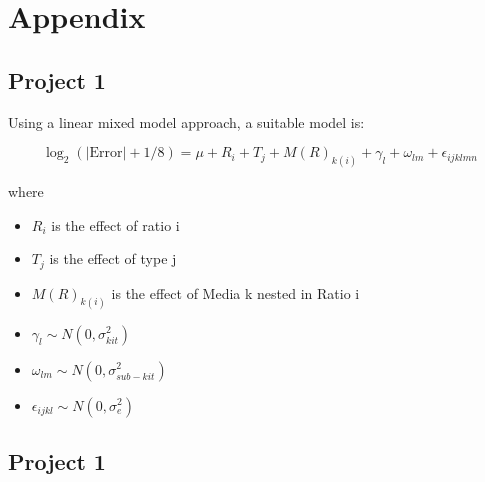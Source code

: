 \documentclass[phd]{nuthesis}
\begin{document}
\section{Appendix}\label{appendix}

\subsection{Project 1}\label{project-1-1}

Using a linear mixed model approach, a suitable model is:

\[
\log_2(|\text{Error}|+ 1/8)=\mu+R_i+T_j+M(R)_{k(i)} + \gamma_l + \omega_{lm} +  \epsilon_{ijklmn}
\]

where

\begin{itemize}
\tightlist
\item
  \(R_i\) is the effect of ratio i
\item
  \(T_j\) is the effect of type j
\item
  \(M(R)_{k(i)}\) is the effect of Media k nested in Ratio i
\item
  \(\gamma_l\sim N(0,\sigma^2_{kit})\)
\item
  \(\omega_{lm}\sim N(0,\sigma^2_{sub-kit})\)
\item
  \(\epsilon_{ijkl}\sim N(0,\sigma^2_{e})\)
\end{itemize}

\subsection{Project 1}\label{project-1-2}

\begin{Shaded}
\begin{Highlighting}[]
\OtherTok{\textless{}{-}} \NormalTok{(}\NormalTok{) }\SpecialCharTok{\%\textgreater{}\%} 
  \SpecialCharTok{!=} \NormalTok{)}
\NormalTok{(}\SpecialCharTok{*}\NormalTok{, }\SpecialCharTok{+} 
  \NormalTok{() }\SpecialCharTok{+} 
  \NormalTok{(} \NormalTok{, } \NormalTok{) }\SpecialCharTok{+}
  \SpecialCharTok{\textasciitilde{}} \NormalTok{) }\SpecialCharTok{+} 
  \NormalTok{() }\SpecialCharTok{+} 
  \NormalTok{(} \SpecialCharTok{/}\NormalTok{)}
\end{Highlighting}
\end{Shaded}
\end{document}
